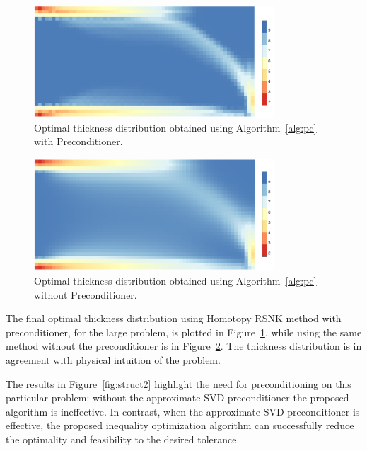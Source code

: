 \begin{figure}[tbp]
  \begin{center}
    \includegraphics*[width=0.8\textwidth]{./figs/chap6_fstopo/medium_thickness_color.pdf}%
    \caption{Optimal thickness distribution obtained using Algorithm~\ref{alg:pc} with Preconditioner.
      \label{fig:thick}}
  \end{center}
\end{figure}

\begin{figure}[tbp]
  \begin{center}
    \includegraphics*[width=0.8\textwidth]{./figs/chap6_fstopo/medium_eye_thickness_color.pdf}%
    \caption{Optimal thickness distribution obtained using Algorithm~\ref{alg:pc} without Preconditioner.
      \label{fig:thick_eye}}
  \end{center}
\end{figure}
    
The final optimal thickness distribution using Homotopy RSNK method with preconditioner, 
for the large problem, is plotted in Figure~\ref{fig:thick}, while using the same method 
without the preconditioner is in Figure~\ref{fig:thick_eye}. 
The thickness distribution is in agreement with physical
intuition of the problem. 


The results in Figure~\ref{fig:struct2} highlight the need for preconditioning
on this particular problem: without the approximate-SVD preconditioner the
proposed algorithm is ineffective. 
In contrast, when the approximate-SVD preconditioner is effective, the
proposed inequality optimization algorithm can successfully reduce the optimality 
and feasibility to the desired tolerance.

